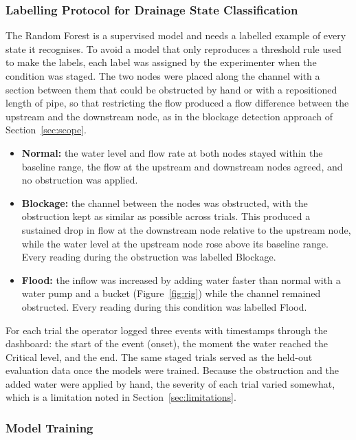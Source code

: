 \documentclass[12pt, a4paper]{article}
\begin{document}
\subsubsection{Labelling Protocol for Drainage State Classification}
\label{sec:labelling-protocol}

The Random Forest is a supervised model and needs a labelled example of every state it recognises. To avoid a model that only reproduces a threshold rule used to make the labels, each label was assigned by the experimenter when the condition was staged. The two nodes were placed along the channel with a section between them that could be obstructed by hand or with a repositioned length of pipe, so that restricting the flow produced a flow difference between the upstream and the downstream node, as in the blockage detection approach of Section~\ref{sec:scope}.

\begin{itemize}
    \item \textbf{Normal:} the water level and flow rate at both nodes stayed within the baseline range, the flow at the upstream and downstream nodes agreed, and no obstruction was applied.
    \item \textbf{Blockage:} the channel between the nodes was obstructed, with the obstruction kept as similar as possible across trials. This produced a sustained drop in flow at the downstream node relative to the upstream node, while the water level at the upstream node rose above its baseline range. Every reading during the obstruction was labelled Blockage.
    \item \textbf{Flood:} the inflow was increased by adding water faster than normal with a water pump and a bucket (Figure~\ref{fig:rig}) while the channel remained obstructed. Every reading during this condition was labelled Flood.
\end{itemize}

\noindent For each trial the operator logged three events with timestamps through the dashboard: the start of the event (onset), the moment the water reached the Critical level, and the end. The same staged trials served as the held-out evaluation data once the models were trained. Because the obstruction and the added water were applied by hand, the severity of each trial varied somewhat, which is a limitation noted in Section~\ref{sec:limitations}.

\subsubsection{Model Training}
\label{sec:model-training}
\end{document}

